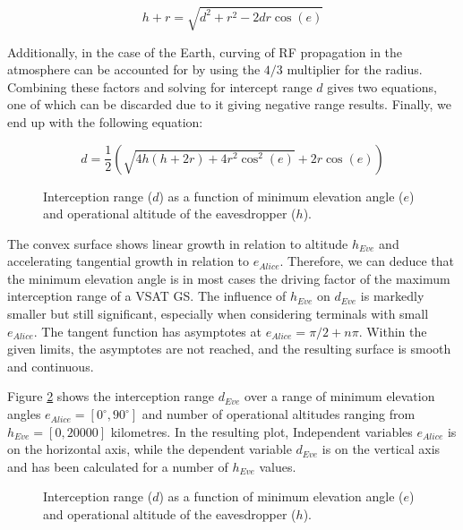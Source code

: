\documentclass[english, 12pt, a4paper, elec, utf8, a-1b, online]{aaltothesis}
\begin{document}
\begin{equation} \label{eq-range-3}
  h + r = \sqrt{d^2 + r^2 - 2 d r \cos(e)}
\end{equation}

Additionally, in the case of the Earth, curving of RF propagation in the atmosphere can be accounted for by using the $4/3$ multiplier for the radius. Combining these factors and solving for intercept range $d$ gives two equations, one of which can be discarded due to it giving negative range results. Finally, we end up with the following equation:

\begin{equation} \label{eq-range-4}
  d = \frac{1}{2} (\sqrt{4 h (h + 2 r) + 4 r^2 \cos^2(e)} + 2 r \cos(e))
\end{equation}

\begin{figure}[h]
  \centering
  
  \caption{Interception range ($d$) as a function of minimum elevation angle ($e$) and operational altitude of the eavesdropper ($h$).}
  \label{fig-interception-range-2d}
\end{figure}

The convex surface shows linear growth in relation to altitude $h_{Eve}$ and accelerating tangential growth in relation to $e_{Alice}$.
Therefore, we can deduce that the minimum elevation angle is in most cases the driving factor of the maximum interception range of a VSAT GS.
The influence of $h_{Eve}$ on $d_{Eve}$ is markedly smaller but still significant, especially when considering terminals with small $e_{Alice}$.
The tangent function has asymptotes at $e_{Alice} = \pi / 2 + n\pi$. Within the given limits, the asymptotes are not reached, and the resulting surface is smooth and continuous.

Figure \ref{fig-interception-range-3d} shows the interception range $d_{Eve}$ over a range of minimum elevation angles $e_{Alice} = [0^\circ, 90^\circ]$ and number of operational altitudes ranging from $h_{Eve} = [0,20000]$ kilometres. %
In the resulting plot,
Independent variables $e_{Alice}$ is on the horizontal axis, while the dependent variable $d_{Eve}$ is on the vertical axis and has been calculated for a number of $h_{Eve}$ values.

\begin{figure}[h]
  \centering
  
  \caption{Interception range ($d$) as a function of minimum elevation angle ($e$) and operational altitude of the eavesdropper ($h$).}
  \label{fig-interception-range-3d}
\end{figure}
\end{document}

